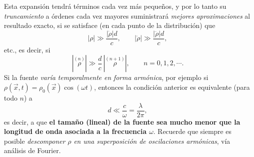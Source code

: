 Esta expansión tendrá términos cada vez más pequeños, y por lo tanto su \textit{truncamiento} a órdenes cada vez mayores suministrará \textit{mejores aproximaciones} al resultado exacto, si se satisface (en cada punto de la distribución) que
\begin{equation}
 |\rho|\gg \frac{|\dot{\rho}|d}{c}, \qquad  |\dot{\rho}|\gg \frac{|\ddot{\rho}|d}{c},
\end{equation}
etc., es decir, si
\begin{equation}
|\stackrel{(n)}{\rho}|\gg \frac{d}{c}\,|\stackrel{(n+1)}{\rho}|, \qquad n=0,1,2,\cdots .
\end{equation}
Si la fuente \textit{varía temporalmente en forma armónica}, por ejemplo si $\rho(\vec{x},t)=\rho_0(\vec{x})\cos(\omega t)$, entonces la condición anterior es equivalente (para todo $n$) a
\begin{equation}
d\ll\frac{c}{\omega}=\frac{\lambda}{2\pi},
\end{equation}
es decir, a que \textbf{el tamaño (lineal) de la fuente sea mucho menor que la longitud de onda asociada a la frecuencia $\omega$}. Recuerde que siempre es posible \textit{descomponer $\rho$ en una superposición de oscilaciones armónicas}, vía análisis de Fourier.

